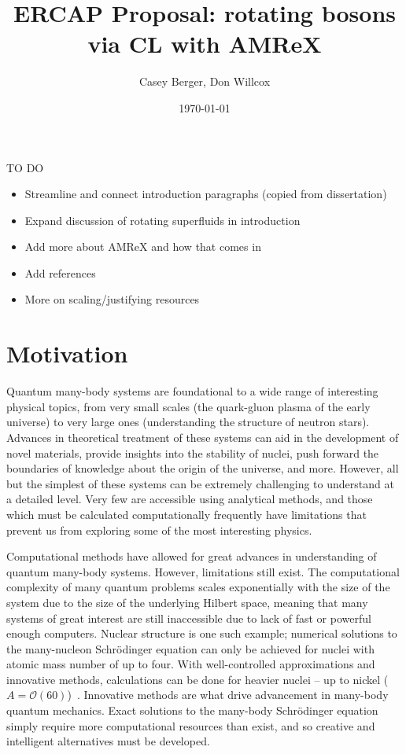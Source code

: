 \documentclass[onecolumn, 12pt]{report}
\title{ERCAP Proposal: rotating bosons via CL with AMReX}
\author{Casey Berger, Don Willcox}
\date{\today}
\begin{document}
TO DO
\begin{itemize}
	\item Streamline and connect introduction paragraphs (copied from dissertation)
	\item Expand discussion of rotating superfluids in introduction
	\item Add more about AMReX and how that comes in
	\item Add references
	\item More on scaling/justifying resources  
\end{itemize}
\section{Motivation}

Quantum many-body systems are foundational to a wide range of interesting physical topics, from very small scales (the quark-gluon plasma of the early universe) to very large ones (understanding the structure of neutron stars). Advances in theoretical treatment of these systems can aid in the development of novel materials, provide insights into the stability of nuclei, push forward the boundaries of knowledge about the origin of the universe, and more. However, all but the simplest of these systems can be extremely challenging to understand at a detailed level. Very few are accessible using analytical methods, and those which must be calculated computationally frequently have limitations that prevent us from exploring some of the most interesting physics. 

Computational methods have allowed for great advances in understanding of quantum many-body systems. However, limitations still exist. The computational complexity of many quantum problems scales exponentially with the size of the system due to the size of the underlying Hilbert space, meaning that many systems of great interest are still inaccessible due to lack of fast or powerful enough computers. Nuclear structure is one such example; numerical solutions to the many-nucleon Schr\"{o}dinger equation can only be achieved for nuclei with atomic mass number of up to four. With well-controlled approximations and innovative methods, calculations can be done for heavier nuclei -- up to nickel ($A = \mathcal{O}(60)$)~\cite{2016AbInitioNuclearStructureReactions}.
Innovative methods are what drive advancement in many-body quantum mechanics. Exact solutions to the many-body Schr\"{o}dinger equation simply require more computational resources than exist, and so creative and intelligent alternatives must be developed.
\end{document}
